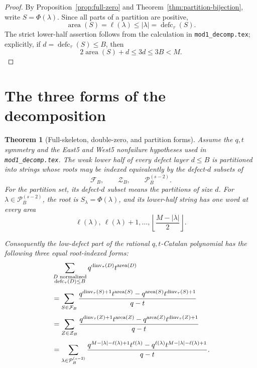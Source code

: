 \documentclass[11pt]{article}
\newtheorem{theorem}{Theorem}[section]
\theoremstyle{definition}
\theoremstyle{remark}
\newcommand{\area}{\operatorname{area}}
\newcommand{\dinv}{\operatorname{dinv}}
\newcommand{\defc}{\operatorname{defc}}
\begin{document}
\begin{proof}
By Proposition~\ref{prop:full-zero} and
Theorem~\ref{thm:partition-bijection}, write $S=\Phi(\lambda)$.  Since all
parts of a partition are positive,
\[
  \area(S)=\ell(\lambda)\le|\lambda|=\defc_\tau(S).
\]
The strict lower-half assertion follows from the calculation in
\texttt{mod1\_decomp.tex}; explicitly, if $d=\defc_\tau(S)\le B$, then
\[
  2\area(S)+d\le3d\le3B<M.
\]
\end{proof}

\section{The three forms of the decomposition}

\begin{theorem}[Full-skeleton, double-zero, and partition forms]
\label{thm:three-forms}
Assume the $q,t$ symmetry and the East5 and West5 nonfailure hypotheses used
in \texttt{mod1\_decomp.tex}.  The weak lower half of every defect layer
$d\le B$ is partitioned into strings whose roots may be indexed equivalently
by the defect-$d$ subsets of
\[
  \mathcal F_B,
  \qquad \mathcal Z_B,
  \qquad \mathcal P_B^{(s-2)}.
\]
For the partition set, its defect-$d$ subset means the partitions of size
$d$.
For $\lambda\in\mathcal P_B^{(s-2)}$, the root is
$S_\lambda=\Phi(\lambda)$, and its lower-half string has one word at every
area
\[
  \ell(\lambda),\ \ell(\lambda)+1,\ldots,
  \left\lfloor\frac{M-|\lambda|}{2}\right\rfloor.
\]

Consequently the low-defect part of the rational $q,t$-Catalan polynomial
has the following three equal root-indexed forms:
\begin{align}
 &\sum_{\substack{D\text{ normalized}\\\defc_\tau(D)\le B}}
 q^{\dinv_\tau(D)}t^{\area(D)}
 \notag\\[1mm]
 &=\sum_{S\in\mathcal F_B}
 \frac{
 q^{\dinv_\tau(S)+1}t^{\area(S)}
 -q^{\area(S)}t^{\dinv_\tau(S)+1}
 }{q-t}
 \label{eq:full-form}\\[1mm]
 &=\sum_{Z\in\mathcal Z_B}
 \frac{
 q^{\dinv_\tau(Z)+1}t^{\area(Z)}
 -q^{\area(Z)}t^{\dinv_\tau(Z)+1}
 }{q-t}
 \label{eq:zero-form}\\[1mm]
 &=\sum_{\lambda\in\mathcal P_B^{(s-2)}}
 \frac{
 q^{M-|\lambda|-\ell(\lambda)+1}t^{\ell(\lambda)}
 -q^{\ell(\lambda)}t^{M-|\lambda|-\ell(\lambda)+1}
 }{q-t}.
 \label{eq:partition-form}
\end{align}
\end{theorem}
\end{document}

